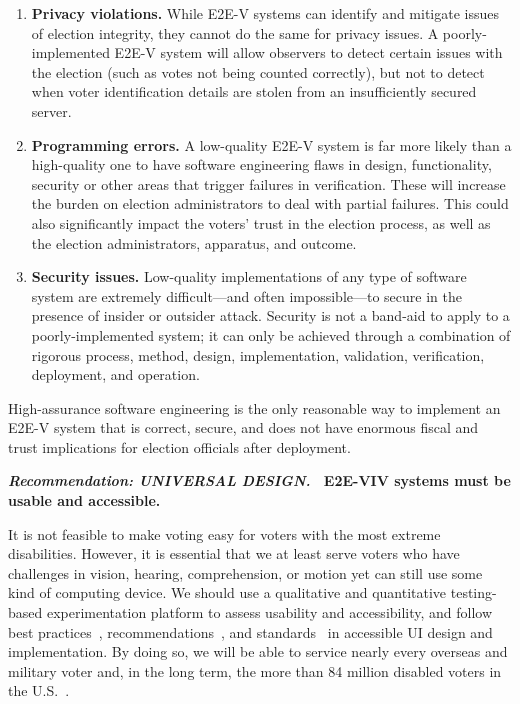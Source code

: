 \begin{enumerate}
\item \textbf{Privacy violations.} While E2E-V systems can identify
  and mitigate issues of election integrity, they cannot do the same
  for privacy issues. A poorly-implemented E2E-V system will allow
  observers to detect certain issues with the election (such as votes
  not being counted correctly), but not to detect when voter
  identification details are stolen from an insufficiently secured
  server.
\item \textbf{Programming errors.} A low-quality E2E-V system is far
  more likely than a high-quality one to have software engineering
  flaws in design, functionality, security or other areas that trigger
  failures in verification. These will increase the burden on election
  administrators to deal with partial failures. This could also
  significantly impact the voters' trust in the election process, as
  well as the election administrators, apparatus, and outcome.
\item \textbf{Security issues.} Low-quality implementations of any
  type of software system are extremely difficult---and often
  impossible---to secure in the presence of insider or outsider
  attack. Security is not a band-aid to apply to a poorly-implemented
  system; it can only be achieved through a combination of rigorous
  process, method, design, implementation, validation, verification,
  deployment, and operation.
\end{enumerate}

High-assurance software engineering is the only reasonable way to
implement an E2E-V system that is correct, secure, and does not have
enormous fiscal and trust implications for election officials after
deployment.

\vspace{12pt} \textbf{\emph{Recommendation: UNIVERSAL DESIGN.} \
  E2E-VIV systems must be usable and accessible.}

It is not feasible to make voting easy for voters with the most
extreme disabilities. However, it is essential that we at least serve
voters who have challenges in vision, hearing, comprehension, or
motion yet can still use some kind of computing device. We should use
a qualitative and quantitative testing-based experimentation platform
to assess usability and accessibility, and follow best
practices~\cite{materials-at-elections.itif.org},
recommendations~\cite{WAI,Section508,WAVE}, and
standards~\cite{ADAStandards} in accessible UI design and
implementation. By doing so, we will be able to service nearly every
overseas and military voter and, in the long term, the more than 84
million disabled voters in the U.S.~\cite{CensusData}.

